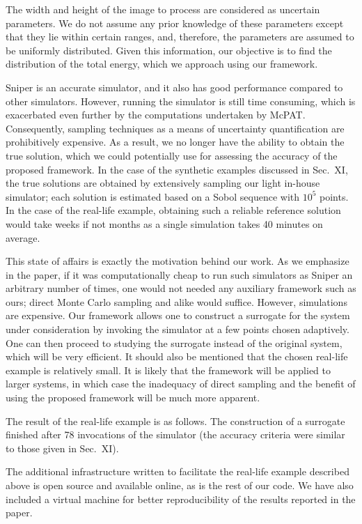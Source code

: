 \begin{authors}
The width and height of the image to process are considered as uncertain
parameters. We do not assume any prior knowledge of these parameters except that
they lie within certain ranges, and, therefore, the parameters are assumed to be
uniformly distributed. Given this information, our objective is to find the
distribution of the total energy, which we approach using our framework.

Sniper is an accurate simulator, and it also has good performance compared to
other simulators. However, running the simulator is still time consuming, which
is exacerbated even further by the computations undertaken by McPAT.
Consequently, sampling techniques as a means of uncertainty quantification are
prohibitively expensive. As a result, we no longer have the ability to obtain
the true solution, which we could potentially use for assessing the accuracy of
the proposed framework. In the case of the synthetic examples discussed in
Sec.~XI, the true solutions are obtained by extensively sampling our light
in-house simulator; each solution is estimated based on a Sobol sequence with
$10^5$ points. In the case of the real-life example, obtaining such a reliable
reference solution would take weeks if not months as a single simulation takes
40 minutes on average.

This state of affairs is exactly the motivation behind our work. As we emphasize
in the paper, if it was computationally cheap to run such simulators as Sniper
an arbitrary number of times, one would not needed any auxiliary framework such
as ours; direct Monte Carlo sampling and alike would suffice. However,
simulations are expensive. Our framework allows one to construct a surrogate for
the system under consideration by invoking the simulator at a few points chosen
adaptively. One can then proceed to studying the surrogate instead of the
original system, which will be very efficient. It should also be mentioned that
the chosen real-life example is relatively small. It is likely that the
framework will be applied to larger systems, in which case the inadequacy of
direct sampling and the benefit of using the proposed framework will be much
more apparent.

The result of the real-life example is as follows. The construction of a
surrogate finished after 78 invocations of the simulator (the accuracy criteria
were similar to those given in Sec.~XI).

The additional infrastructure written to facilitate the real-life example
described above is open source and available online, as is the rest of our code.
We have also included a virtual machine for better reproducibility of the
results reported in the paper.

\begin{actions}

\end{actions}
\end{authors}
